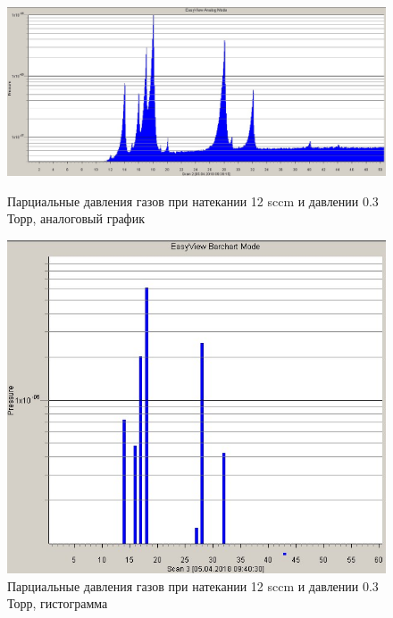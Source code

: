 \documentclass[a4paper]{article}
\begin{document}
\begin{figure}[h]
\begin{center}
\begin{minipage}[h]{0.5\linewidth}
\includegraphics[width=1\linewidth]{flow12analog.jpg}
\caption{Парциальные давления газов при натекании 12 sccm и давлении 0.3 Торр, аналоговый график  } %
\end{minipage}
\hfill 
\begin{minipage}[h]{0.4\linewidth}
\includegraphics[width=1\linewidth]{flow12gisto.jpg}
\caption{Парциальные давления газов при натекании 12 sccm и давлении 0.3 Торр, гистограмма  }
\label{ris:experimcoded}
\end{minipage}
\end{center}
\end{figure}
\end{document}
